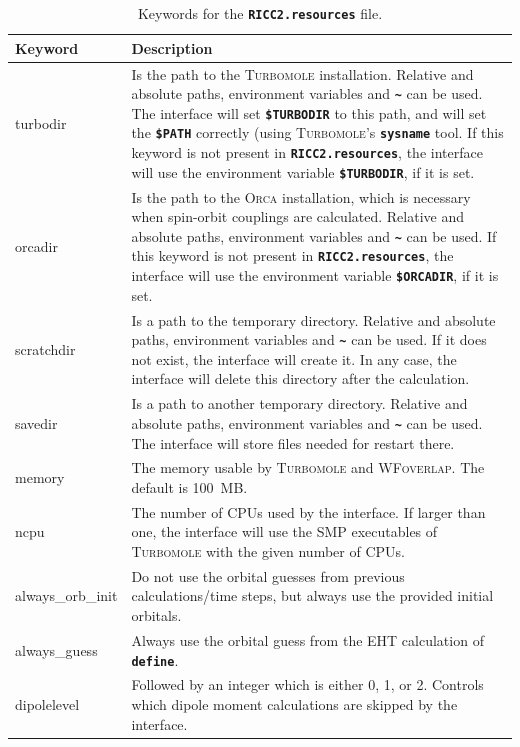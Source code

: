 \documentclass[a4paper,10pt,DIV=15,openany]{scrbook}
\newcommand{\ttt}[1]{\textbf{\texttt{#1}}}
\begin{document}
\begin{table}
  \centering
  \caption{Keywords for the \ttt{RICC2.resources} file.}
  \label{tab:ricc2_sh2}
  \begin{tabular}{>{\ttfamily}lp{12cm}}
  \hline
  Keyword       &Description\\
  \hline
turbodir        &Is the path to the \textsc{Turbomole} installation. Relative and absolute paths, environment variables and \ttt{\textasciitilde} can be used. The interface will set \ttt{\$TURBODIR} to this path, and will set the \ttt{\$PATH} correctly (using \textsc{Turbomole}'s \ttt{sysname} tool. If this keyword is not present in \ttt{RICC2.resources}, the interface will use the environment variable \ttt{\$TURBODIR}, if it is set.\\
orcadir         &Is the path to the \textsc{Orca} installation, which is necessary when spin-orbit couplings are calculated. Relative and absolute paths, environment variables and \ttt{\textasciitilde} can be used. If this keyword is not present in \ttt{RICC2.resources}, the interface will use the environment variable \ttt{\$ORCADIR}, if it is set.\\
scratchdir      &Is a path to the temporary directory. Relative and absolute paths, environment variables and \ttt{\textasciitilde} can be used. If it does not exist, the interface will create it. In any case, the interface will delete this directory after the calculation.\\
savedir         &Is a path to another temporary directory.  Relative and absolute paths, environment variables and \ttt{\textasciitilde} can be used. The interface will store files needed for restart there.\\
memory          &The memory usable by \textsc{Turbomole} and \textsc{WFoverlap}. The default is 100~MB.\\
ncpu            & The number of CPUs used by the interface. If larger than one, the interface will use the SMP executables of \textsc{Turbomole} with the given number of CPUs.\\
always\_orb\_init &Do not use the orbital guesses from previous calculations/time steps, but always use the provided initial orbitals.\\
always\_guess   &Always use the orbital guess from the EHT calculation of \ttt{define}.\\
dipolelevel     &Followed by an integer which is either 0, 1, or 2. Controls which dipole moment calculations are skipped by the interface.\\

\end{tabular}
\end{table}
\end{document}
